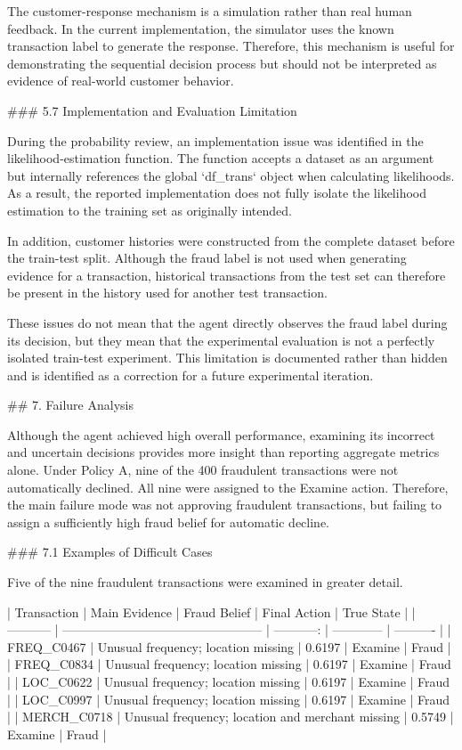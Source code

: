 The customer-response mechanism is a simulation rather than real human feedback. In the current implementation, the simulator uses the known transaction label to generate the response. Therefore, this mechanism is useful for demonstrating the sequential decision process but should not be interpreted as evidence of real-world customer behavior.

### 5.7 Implementation and Evaluation Limitation

During the probability review, an implementation issue was identified in the likelihood-estimation function. The function accepts a dataset as an argument but internally references the global `df_trans` object when calculating likelihoods. As a result, the reported implementation does not fully isolate the likelihood estimation to the training set as originally intended.

In addition, customer histories were constructed from the complete dataset before the train-test split. Although the fraud label is not used when generating evidence for a transaction, historical transactions from the test set can therefore be present in the history used for another test transaction.

These issues do not mean that the agent directly observes the fraud label during its decision, but they mean that the experimental evaluation is not a perfectly isolated train-test experiment. This limitation is documented rather than hidden and is identified as a correction for a future experimental iteration.

## 7. Failure Analysis

Although the agent achieved high overall performance, examining its incorrect and uncertain decisions provides more insight than reporting aggregate metrics alone. Under Policy A, nine of the 400 fraudulent transactions were not automatically declined. All nine were assigned to the Examine action. Therefore, the main failure mode was not approving fraudulent transactions, but failing to assign a sufficiently high fraud belief for automatic decline.

### 7.1 Examples of Difficult Cases

Five of the nine fraudulent transactions were examined in greater detail.

| Transaction | Main Evidence                                    | Fraud Belief | Final Action | True State |
| ----------- | ------------------------------------------------ | -----------: | ------------ | ---------- |
| FREQ_C0467  | Unusual frequency; location missing              |       0.6197 | Examine      | Fraud      |
| FREQ_C0834  | Unusual frequency; location missing              |       0.6197 | Examine      | Fraud      |
| LOC_C0622   | Unusual frequency; location missing              |       0.6197 | Examine      | Fraud      |
| LOC_C0997   | Unusual frequency; location missing              |       0.6197 | Examine      | Fraud      |
| MERCH_C0718 | Unusual frequency; location and merchant missing |       0.5749 | Examine      | Fraud      |

